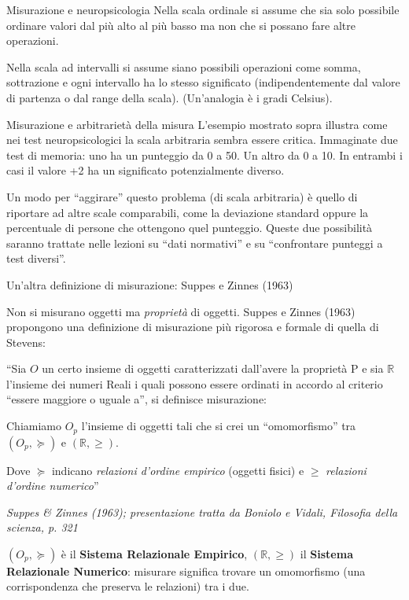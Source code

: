 \documentclass[
  ignorenonframetext,
  aspectratio=169,
]{beamer}
\begin{document}
\begin{frame}{Misurazione e neuropsicologia}
\label{misurazione-e-neuropsicologia-1}
Nella scala ordinale si assume che sia solo possibile ordinare valori
dal più alto al più basso ma non che si possano fare altre operazioni.

Nella scala ad intervalli si assume siano possibili operazioni come
somma, sottrazione e ogni intervallo ha lo stesso significato
(indipendentemente dal valore di partenza o dal range della scala).
(Un'analogia è i gradi Celsius).
\end{frame}

\begin{frame}{Misurazione e arbitrarietà della misura}
\label{misurazione-e-arbitrarietuxe0-della-misura}
L'esempio mostrato sopra illustra come nei test neuropsicologici la
scala arbitraria sembra essere critica. Immaginate due test di memoria:
uno ha un punteggio da 0 a 50. Un altro da 0 a 10. In entrambi i casi il
valore +2 ha un significato potenzialmente diverso.

Un modo per ``aggirare'' questo problema (di scala arbitraria) è quello
di riportare ad altre scale comparabili, come la deviazione standard
oppure la percentuale di persone che ottengono quel punteggio. Queste
due possibilità saranno trattate nelle lezioni su ``dati normativi'' e
su ``confrontare punteggi a test diversi''.
\end{frame}

\begin{frame}{Un'altra definizione di misurazione: Suppes e Zinnes
(1963)}
\label{unaltra-definizione-di-misurazione-suppes-e-zinnes-1963}
\small

Non si misurano oggetti ma \emph{proprietà} di oggetti. Suppes e Zinnes
(1963) propongono una definizione di misurazione più rigorosa e formale
di quella di Stevens:

``Sia \(O\) un certo insieme di oggetti caratterizzati dall'avere la
proprietà P e sia \(\mathbb{R}\) l'insieme dei numeri Reali i quali
possono essere ordinati in accordo al criterio ``essere maggiore o
uguale a'', si definisce misurazione:

Chiamiamo \(O_p\) l'insieme di oggetti tali che si crei un
``omomorfismo'' tra \((O_p, \succcurlyeq)\) e \((\mathbb{R}, \geq)\).

Dove \(\succcurlyeq\) indicano \emph{relazioni d’ordine empirico}
(oggetti fisici) e \(\geq\) \emph{relazioni d’ordine numerico}''

\begin{flushright}
\emph{Suppes \& Zinnes (1963); presentazione tratta da Boniolo e Vidali, Filosofia della scienza, p. 321}
\end{flushright}

\vspace{1em}

\((O_p,\succcurlyeq)\) è il \textbf{Sistema Relazionale Empirico},
\((\mathbb{R},\geq)\) il \textbf{Sistema Relazionale Numerico}: misurare
significa trovare un omomorfismo (una corrispondenza che preserva le
relazioni) tra i due.
\end{frame}
\end{document}
